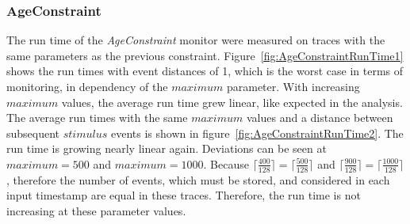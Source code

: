 \subsubsection{AgeConstraint}
The run time of the \textit{AgeConstraint} monitor were measured on traces with the same parameters as the previous constraint. Figure~\ref{fig:AgeConstraintRunTime1} shows the run times with event distances of 1, which is the worst case in terms of monitoring, in dependency of the $maximum$ parameter. With increasing $maximum$ values, the average run time grew linear, like expected in the analysis. The average run times with the same $maximum$ values and a distance between subsequent $stimulus$ events is shown in figure~\ref{fig:AgeConstraintRunTime2}. The run time is growing nearly linear again. Deviations can be seen at $maximum=500$ and $maximum=1000$. Because $\lceil\frac{400}{128}\rceil=\lceil\frac{500}{128}\rceil$ and $\lceil\frac{900}{128}\rceil=\lceil\frac{1000}{128}\rceil$, therefore the number of events, which must be stored, and considered in each input timestamp are equal in these traces. Therefore, the run time is not increasing at these parameter values.
